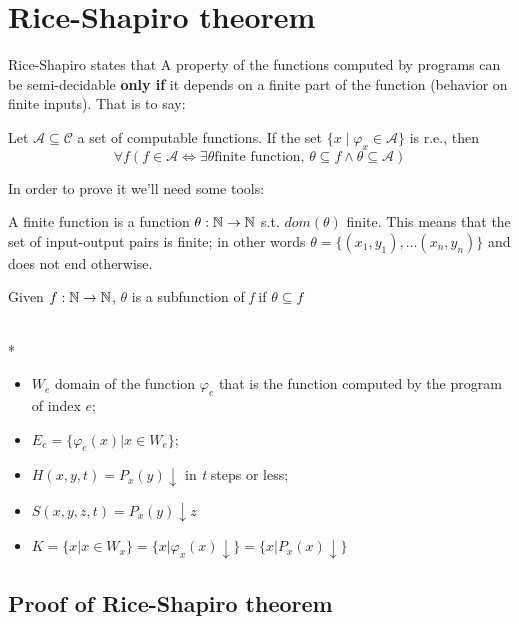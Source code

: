 \chapter {Rice-Shapiro theorem}
Rice-Shapiro states that A property of the functions computed by
programs can be semi-decidable \textbf{only if} it depends on a finite
part of the function (behavior on finite inputs). That is to say:

\begin{theorem}

  Let $\mathcal{A} \subseteq \mathcal{C}$ a set of computable
  functions. If the set $\{x \mid \varphi_x \in \mathcal{A}\}$ is
  r.e., then
  \[
    \forall f (f \in \mathcal{A} \Leftrightarrow \exists \theta \mbox{
      finite function, } \theta \subseteq f \land \theta \subseteq
    \mathcal{A})
  \]
\end{theorem}

In order to prove it we'll need some tools:

\begin{definition}
  A finite function is a function $ \theta: \mathbb{N}\rightarrow\mathbb{N} $
  s.t. $ dom(\theta) $ finite.  This means that the set of
  input-output pairs is finite; in other words
  $ \theta = \{(x_1,y_1),\dots(x_n,y_n) \} $ and does not end
  otherwise.
\end{definition}

Given $ f:\mathbb{N}\rightarrow\mathbb{N} $, $ \theta $ is a subfunction of
\textit{f} if $ \theta \subseteq f $

\begin{notation}\mbox{}\\*
  \begin{itemize}
  \item $ W_e $ domain of the function $ \varphi_e $ that is the function
    computed by the program of index $e$;
  \item $ E_e = \{\varphi_e(x)|x\in W_e \}$;
  \item $ H(x,y,t) = P_x(y)\downarrow $ in \textit{t} steps or less;
  \item $ S(x,y,z,t) = P_x(y)\downarrow z $
  \item $ K = \{x|x\in W_x \} = \{x|\varphi_x(x)\downarrow \} =
    \{x|P_x(x)\downarrow \}$
  \end{itemize}
\end{notation}

\section{Proof of Rice-Shapiro theorem}

